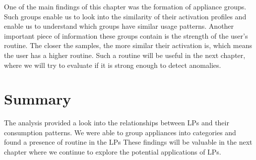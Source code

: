 One of the main findings of this chapter was the formation of appliance groups.
Such groups enable us to look into the similarity of their activation profiles and enable us to understand which groups have similar usage patterns.
Another important piece of information these groups contain is the strength of the user's routine.
The closer the samples, the more similar their activation is, which means the user has a higher routine.
Such a routine will be useful in the next chapter, where we will try to evaluate if it is strong enough to detect anomalies.

\section{Summary}

The analysis provided a look into the relationships between LPs and their consumption patterns.
We were able to group appliances into categories and found a presence of routine in the LPs
These findings will be valuable in the next chapter where we continue to explore the potential applications of LPs.

